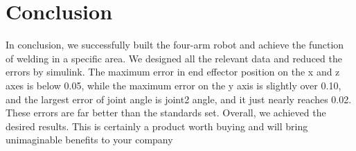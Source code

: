\section{Conclusion}

In conclusion, we successfully built the four-arm robot and achieve the function of welding in a specific area. We designed all the relevant data and reduced the errors by simulink. The maximum error in end effector position on the x and z axes is below 0.05, while the maximum error on the y axis is slightly over 0.10, and the largest error of joint angle is joint2 angle, and it just nearly reaches 0.02. These errors are far better than the standards set. Overall, we achieved the desired results. This is certainly a product worth buying and will bring unimaginable benefits to your company